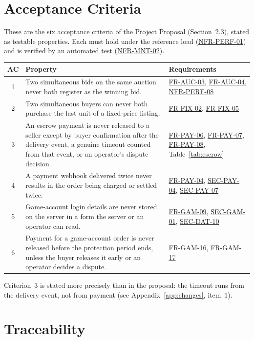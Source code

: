 \documentclass[11pt,a4paper]{report}
\newcommand{\rr}[1]{\hyperlink{#1}{#1}}
\begin{document}
\chapter{Acceptance Criteria}
\label{app:accept}
These are the six acceptance criteria of the Project Proposal (Section~2.3), stated as testable properties. Each must hold under the reference load (\rr{NFR-PERF-01}) and is verified by an automated test (\rr{NFR-MNT-02}).
\begin{center}
\small
\begin{tabularx}{\textwidth}{@{}c X >{\raggedright\arraybackslash}p{4.2cm}@{}}
\toprule
\textbf{AC} & \textbf{Property} & \textbf{Requirements} \\
\midrule
1 & Two simultaneous bids on the same auction never both register as the winning bid. & \rr{FR-AUC-03}, \rr{FR-AUC-04}, \rr{NFR-PERF-08} \\
2 & Two simultaneous buyers can never both purchase the last unit of a fixed-price listing. & \rr{FR-FIX-02}, \rr{FR-FIX-05} \\
3 & An escrow payment is never released to a seller except by buyer confirmation after the delivery event, a genuine timeout counted from that event, or an operator's dispute decision. & \rr{FR-PAY-06}, \rr{FR-PAY-07}, \rr{FR-PAY-08}, Table~\ref{tab:escrow} \\
4 & A payment webhook delivered twice never results in the order being charged or settled twice. & \rr{FR-PAY-04}, \rr{SEC-PAY-04}, \rr{SEC-PAY-07} \\
5 & Game-account login details are never stored on the server in a form the server or an operator can read. & \rr{FR-GAM-09}, \rr{SEC-GAM-01}, \rr{SEC-DAT-10} \\
6 & Payment for a game-account order is never released before the protection period ends, unless the buyer releases it early or an operator decides a dispute. & \rr{FR-GAM-16}, \rr{FR-GAM-17} \\
\bottomrule
\end{tabularx}
\end{center}
Criterion~3 is stated more precisely than in the proposal: the timeout runs from the delivery event, not from payment (see Appendix~\ref{app:changes}, item~1).

\chapter{Traceability}
\label{app:trace}
\end{document}
